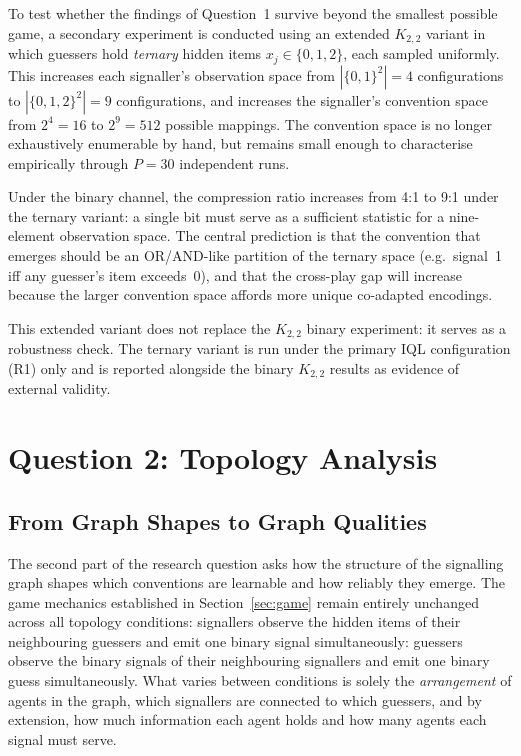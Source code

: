 \documentclass[a4paper,twoside,12pt]{report}
\begin{document}
    To test whether the findings of Question~1 survive beyond the smallest
    possible game, a secondary experiment is conducted using an extended
    $K_{2,2}$ variant in which guessers hold \emph{ternary} hidden items
    $x_j \in \{0, 1, 2\}$, each sampled uniformly. This increases each
    signaller's observation space from $|\{0,1\}^2| = 4$ configurations to
    $|\{0,1,2\}^2| = 9$ configurations, and increases the signaller's
    convention space from $2^4 = 16$ to $2^9 = 512$ possible mappings. The
    convention space is no longer exhaustively enumerable by hand, but
    remains small enough to characterise empirically through $P = 30$
    independent runs.
    
    Under the binary channel, the compression ratio increases from 4:1 to
    9:1 under the ternary variant: a single bit must serve as a sufficient
    statistic for a nine-element observation space. The central prediction is
    that the convention that emerges should be an OR/AND-like partition of the
    ternary space (e.g.\ signal~1 iff any guesser's item exceeds~0), and that
    the cross-play gap will increase because the larger convention space
    affords more unique co-adapted encodings. 
    
    This extended variant does not replace the $K_{2,2}$ binary experiment:
    it serves as a robustness check. The ternary variant is run under the
    primary IQL configuration (R1) only and is reported alongside the
    binary $K_{2,2}$ results as evidence of external validity.
    
    \newpage
    \section{Question 2: Topology Analysis}
    \label{sec:q2}
    
    \subsection{From Graph Shapes to Graph Qualities}
    
    The second part of the research question asks how the structure of the
    signalling graph shapes which conventions are learnable and how reliably they
    emerge. The game mechanics established in Section~\ref{sec:game} remain
    entirely unchanged across all topology conditions: signallers observe the
    hidden items of their neighbouring guessers and emit one binary signal
    simultaneously: guessers observe the binary signals of their neighbouring
    signallers and emit one binary guess simultaneously. What varies between
    conditions is solely the \emph{arrangement} of agents in the graph, which
    signallers are connected to which guessers, and by extension, how much
    information each agent holds and how many agents each signal must serve.
    
\end{document}
